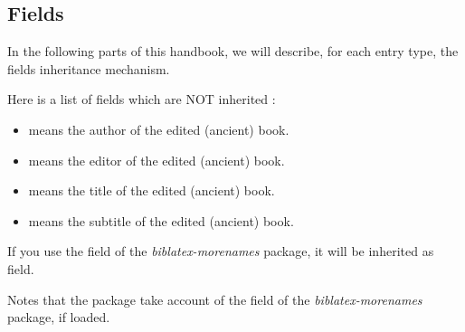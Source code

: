 \documentclass{ltxdockit}[2011/03/25]
\begin{document}
\subsection{Fields}

In the following parts of this handbook, we will describe, for each entry type, the fields inheritance mechanism. 

Here is a list of fields which are NOT inherited :
\begin{itemize}
  \item {} means the author of the edited (ancient) book.
  \item {} means the editor of the edited (ancient) book.
  \item {} means the title of the edited (ancient) book.
  \item {} means the subtitle of the edited (ancient) book.
 
\end{itemize}

If you use the  field of the \emph{biblatex-morenames} package, it will be inherited as  field.

Notes that the package take account of the  field of the \emph{biblatex-morenames} package, if loaded.

\end{document}
